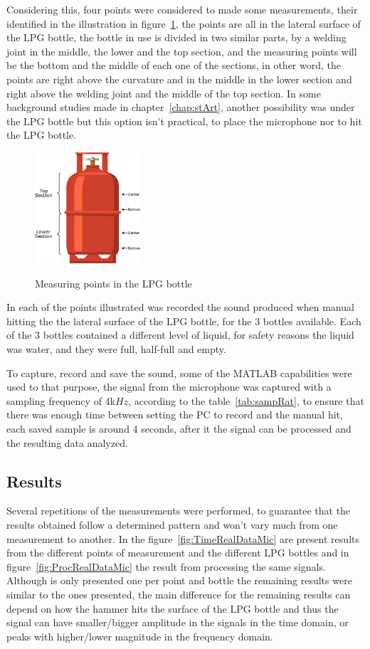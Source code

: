 Considering this, four points were considered to made some measurements, their identified in the illustration in figure~\ref{fig:measPointMic}, the points are all in the lateral surface of the LPG bottle, the bottle in use is divided in two similar parts, by a welding joint in the middle, the lower and the top section, and the measuring points will be the bottom and the middle of each one of the sections, in other word, the points are right above the curvature and in the middle in the lower section and right above the welding joint and the middle of the top section. In some background studies made in chapter~\ref{chap:stArt}, another possibility was under the LPG bottle but this option isn't practical, to place the microphone nor to hit the LPG bottle.
\begin{figure}[]
    \centering
    \includegraphics[width=0.35\textwidth]{Chapters/6CHP/Figures/measuringPointsMic.eps}
    \caption{Measuring points in the LPG bottle}{}
    \label{fig:measPointMic}
\end{figure}
In each of the points illustrated was recorded the sound produced when manual hitting the the lateral surface of the LPG bottle, for the 3 bottles available. Each of the 3 bottles contained a different level of liquid, for safety reasons the liquid was water, and they were full, half-full and empty. 

To capture, record and save the sound, some of the MATLAB capabilities were used to that purpose, the signal from the microphone was captured with a sampling frequency of 4k$Hz$, according to the table~\ref{tab:sampRat}, to ensure that there was enough time between setting the PC to record and the manual hit, each saved sample is around 4 seconds, after it the signal can be processed and the resulting data analyzed.
\subsection{Results}
Several repetitions of the measurements were performed, to guarantee that the results obtained follow a determined pattern and won't vary much from one measurement to another. In the figure~\ref{fig:TimeRealDataMic} are present results from the different points of measurement and the different LPG bottles and in figure~\ref{fig:ProcRealDataMic} the result from processing the same signals. Although is only presented one per point and bottle the remaining results were similar to the ones presented, the main difference for the remaining results can depend on how the hammer hits the surface of the LPG bottle and thus the signal can have smaller/bigger amplitude in the signals in the time domain, or peaks with higher/lower magnitude in the frequency domain.

